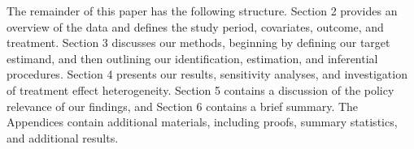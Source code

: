 The remainder of this paper has the following structure. Section 2 provides an overview of the data and defines the study period, covariates, outcome, and treatment. Section 3 discusses our methods, beginning by defining our target estimand, and then outlining our identification, estimation, and inferential procedures. Section 4 presents our results, sensitivity analyses, and investigation of treatment effect heterogeneity. Section 5 contains a discussion of the policy relevance of our findings, and Section 6 contains a brief summary. The Appendices contain additional materials, including proofs, summary statistics, and additional results.
